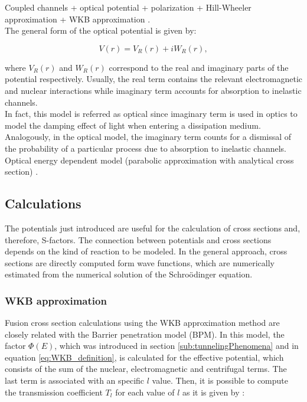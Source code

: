 \documentclass[openany]{book}
\begin{document}
Coupled channels + optical potential +  polarization +  Hill-Wheeler approximation  +  WKB approximation \cite{cardenas_canto_donangelo_hussein_lubian_romanelli_2002}. \\ 

The general form of the optical potential is given by:

\begin{equation}  \label{eq:potential_Optical}
	V(r) = V_R(r) + iW_R(r),
\end{equation}

where $V_R(r)$ and $W_R(r)$ correspond to the real and imaginary parts of the potential respectively. Usually, the real term contains the relevant electromagnetic and nuclear interactions while imaginary term accounts for absorption to inelastic channels. \\

In fact, this model is referred as optical since imaginary term is used in optics to model the damping effect of light when entering a dissipation medium. Analogously, in the optical model, the imaginary term counts for a dismissal of the probability of a particular process due to absorption to inelastic channels. \\

Optical energy dependent model (parabolic approximation with analytical cross section) \cite{singh_sukhvinder_kharab_2013B}. \\

\subsection{Calculations}  \label{sub:potential_calculations}

The potentials just introduced are useful for the calculation of cross sections and, therefore, S-factors. The connection between potentials and cross sections depends on the kind of reaction to be modeled. In the general approach, cross sections are directly computed form wave functions,  which are numerically estimated from the numerical solution of the Schroödinger equation. \\

\subsubsection{WKB approximation} \label{ssub:potential_calculations_WKB}

Fusion cross section calculations using the WKB approximation method are closely related with the Barrier penetration model (BPM). In this model,  the factor $\Phi(E)$, which was introduced in section \ref{sub:tunnelingPhenomena} and in equation \ref{eq:WKB_definition}, is calculated for the effective potential, which consists of the sum of the nuclear, electromagnetic and centrifugal terms. The last term is associated with an specific $l$ value. Then, it is possible to compute the transmission coefficient $T_l$ for each value of $l$ as it is given by \cite{koyuncu_soylu_2018}:
\end{document}
